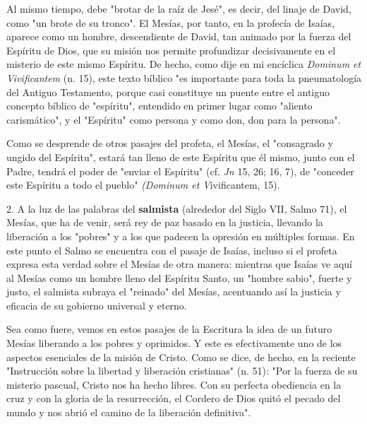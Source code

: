 \begin{body}
\begin{body}
Al mismo tiempo, debe "brotar de la raíz de Jesé", es decir, del linaje de David, como "un brote de su tronco". El Mesías, por tanto, en la profecía de Isaías, aparece como un hombre, descendiente de David, tan animado por la fuerza del Espíritu de Dios, que su misión nos permite profundizar decisivamente en el misterio de este mismo Espíritu. De hecho, como dije en mi encíclica \emph{Dominum et Vivificantem} (n. 15), este texto bíblico "es importante para toda la pneumatología del Antiguo Testamento, porque casi constituye un puente entre el antiguo concepto bíblico de "espíritu", entendido en primer lugar como "aliento carismático", y el "Espíritu" como persona y como don, don para la persona".

Como se desprende de otros pasajes del profeta, el Mesías, el "consagrado y ungido del Espíritu", estará tan lleno de este Espíritu que él mismo, junto con el Padre, tendrá el poder de "enviar el Espíritu" (cf. \emph{Jn} 15, 26; 16, 7), de "conceder este Espíritu a todo el pueblo" \emph{(Dominum et V}ivificantem, 15).

2. A la luz de las palabras del \textbf{salmista} (alrededor del Siglo VII, Salmo 71), el Mesías, que ha de venir, será rey de paz basado en la justicia, llevando la liberación a los "pobres" y a los que padecen la opresión en múltiples formas. En este punto el Salmo se encuentra con el pasaje de Isaías, incluso si el profeta expresa esta verdad sobre el Mesías de otra manera: mientras que Isaías ve aquí al Mesías como un hombre lleno del Espíritu Santo, un "hombre sabio", fuerte y justo, el salmista subraya el "reinado" del Mesías, acentuando así la justicia y eficacia de su gobierno universal y eterno.

Sea como fuere, vemos en estos pasajes de la Escritura la idea de un futuro Mesías liberando a los pobres y oprimidos. Y este es efectivamente uno de los aspectos esenciales de la misión de Cristo. Como se dice, de hecho, en la reciente "Instrucción sobre la libertad y liberación cristianas" (n. 51): "Por la fuerza de su misterio pascual, Cristo nos ha hecho libres. Con su perfecta obediencia en la cruz y con la gloria de la resurrección, el Cordero de Dios quitó el pecado del mundo y nos abrió el camino de la liberación definitiva".


\end{body}
\end{body}
